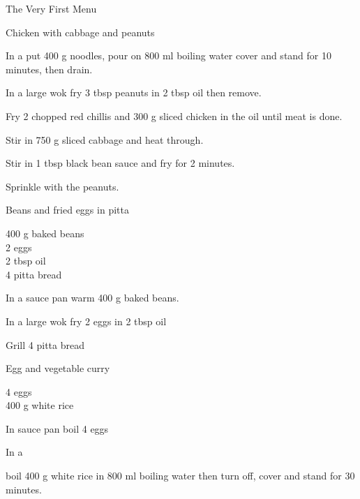 \begin{menu}{The Very First Menu}
\begin{recipe}{2}{Chicken with cabbage and peanuts}
    \begin{instructions}
    \item 
      In a 
      put
      400 g  noodles,
      pour on
      800 ml  boiling water
      cover and stand for 10 minutes, then drain.
    \item 
				In a large wok	fry
				3 tbsp  peanuts
				in
				2 tbsp  oil
				then remove.
			\item 
				Fry 2  chopped red chillis
				and
				300 g sliced chicken
				in the oil until meat is done.
			\item 
				Stir in
				750 g sliced cabbage
				and heat through.
			\item 
				Stir in 
				1 tbsp  black bean sauce
				and fry for 2 minutes.
			\item 
				Sprinkle with the peanuts.
			
    \end{instructions}
    \end{recipe}%
  
    \begin{recipe}{1}{Beans and fried eggs in pitta}%
    
		\begin{ingredients}
		400 g baked beans  \\
	2  eggs  \\
	2 tbsp oil  \\
	4  pitta bread  \\
	
		\end{ingredients}
	
    \begin{instructions}
    \item 
				In a sauce pan warm
				400 g  baked beans.
			\item 
				In a large wok fry
				2   eggs
				in 
				2 tbsp  oil\item 
				Grill
				4   pitta bread
    \end{instructions}
    \end{recipe}%
  
    \begin{recipe}{2}{Egg and vegetable curry}%
    
		\begin{ingredients}
		4  eggs  \\
	400 g white rice  \\
	
		\end{ingredients}
	
    \begin{instructions}
    \item 
				In sauce pan boil
				4   eggs\item 
      In a 
       
      boil 
      400 g  white rice
      in 
      800 ml  boiling water
      then turn off, cover and stand for 30 minutes.
    
    \end{instructions}
    \end{recipe}%
  
    \clearpage
    \end{menu}
	
